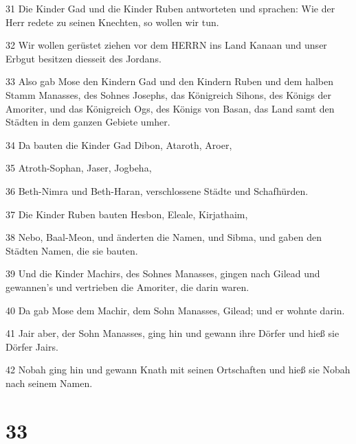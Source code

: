 \par 31 Die Kinder Gad und die Kinder Ruben antworteten und sprachen: Wie der Herr redete zu seinen Knechten, so wollen wir tun.
\par 32 Wir wollen gerüstet ziehen vor dem HERRN ins Land Kanaan und unser Erbgut besitzen diesseit des Jordans.
\par 33 Also gab Mose den Kindern Gad und den Kindern Ruben und dem halben Stamm Manasses, des Sohnes Josephs, das Königreich Sihons, des Königs der Amoriter, und das Königreich Ogs, des Königs von Basan, das Land samt den Städten in dem ganzen Gebiete umher.
\par 34 Da bauten die Kinder Gad Dibon, Ataroth, Aroer,
\par 35 Atroth-Sophan, Jaser, Jogbeha,
\par 36 Beth-Nimra und Beth-Haran, verschlossene Städte und Schafhürden.
\par 37 Die Kinder Ruben bauten Hesbon, Eleale, Kirjathaim,
\par 38 Nebo, Baal-Meon, und änderten die Namen, und Sibma, und gaben den Städten Namen, die sie bauten.
\par 39 Und die Kinder Machirs, des Sohnes Manasses, gingen nach Gilead und gewannen's und vertrieben die Amoriter, die darin waren.
\par 40 Da gab Mose dem Machir, dem Sohn Manasses, Gilead; und er wohnte darin.
\par 41 Jair aber, der Sohn Manasses, ging hin und gewann ihre Dörfer und hieß sie Dörfer Jairs.
\par 42 Nobah ging hin und gewann Knath mit seinen Ortschaften und hieß sie Nobah nach seinem Namen.

\chapter{33}

